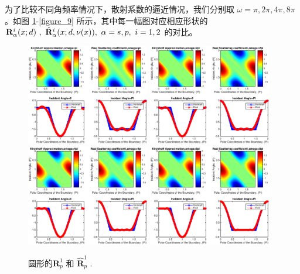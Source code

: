 {为了比较不同角频率情况下，散射系数的逼近情况，我们分别取 $\omega= \pi,2\pi,4\pi,8\pi$。如图 \ref{figure_2}-\ref{figure_9} 所示，其中每一幅图对应相应形状的 $\mathbf{R}_\alpha^i(x;d) \ , \  \hat {\mathbf{R}}_\alpha^i(x;d,\nu(x)), \ \alpha=s,p,  \ i=1,2$ 的对比。
\begin{figure}[htbp]
	\centering
	\includegraphics[width=0.48\textwidth]{./Img/figure_sc_elastic/sc_p1_circle_1.eps}
	\includegraphics[width=0.48\textwidth]{./Img/figure_sc_elastic/sc_p1_circle_2.eps}
	\includegraphics[width=0.48\textwidth]{./Img/figure_sc_elastic/sc_p1_circle_4.eps}
	\includegraphics[width=0.48\textwidth]{./Img/figure_sc_elastic/sc_p1_circle_8.eps}		
	\caption{圆形的$\mathbf{R}_p^1$ 和 $\hat {\mathbf{R}}_p^1$ .}\label{figure_2}
\end{figure}

}
